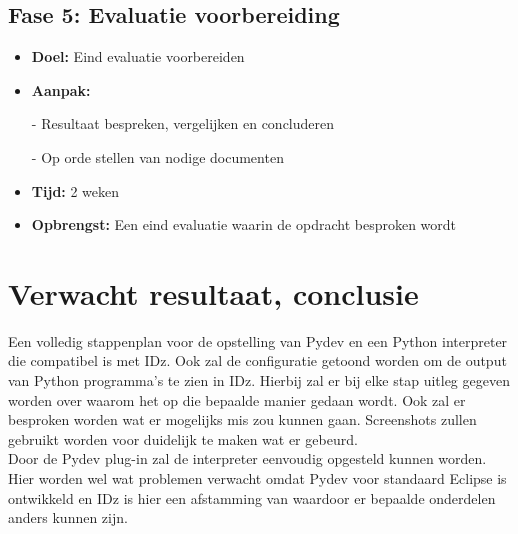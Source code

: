 \subsection{Fase 5: Evaluatie voorbereiding}
\begin{itemize}
    \item \textbf{Doel:}
    Eind evaluatie voorbereiden
    \item \textbf{Aanpak:}
    \item[-] Resultaat bespreken, vergelijken en concluderen
    \item[-] Op orde stellen van nodige documenten
    \item \textbf{Tijd:} 2 weken
    \item \textbf{Opbrengst:}
    Een eind evaluatie waarin de opdracht besproken wordt
\end{itemize}


\section{Verwacht resultaat, conclusie}%
\label{sec:verwachte_resultaten}
Een volledig stappenplan voor de opstelling van Pydev en een Python interpreter die compatibel is met IDz. Ook zal de configuratie getoond worden om de output van Python programma's te zien in IDz. Hierbij zal er bij elke stap uitleg gegeven worden over waarom het op die bepaalde manier gedaan wordt. Ook zal er besproken worden wat er mogelijks mis zou kunnen gaan. Screenshots zullen gebruikt worden voor duidelijk te maken wat er gebeurd. \\ 

Door de Pydev plug-in zal de interpreter eenvoudig opgesteld kunnen worden. Hier worden wel wat problemen verwacht omdat Pydev voor standaard Eclipse is ontwikkeld en IDz is hier een afstamming van waardoor er bepaalde onderdelen anders kunnen zijn. 


 